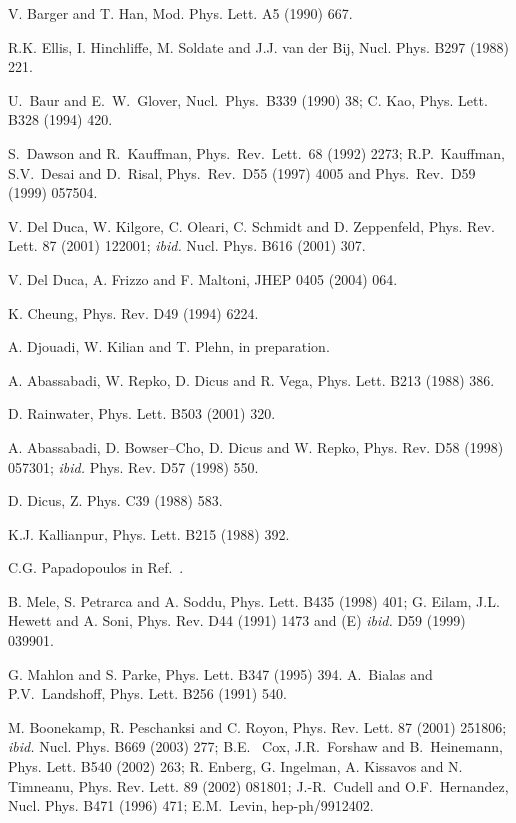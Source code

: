 \begin{thebibliography}{999}
V. Barger and T. Han, Mod. Phys. Lett. A5 (1990) 667.  

 R.K. Ellis, I. Hinchliffe, M. Soldate and J.J. van der 
Bij, Nucl. Phys. B297 (1988) 221.  

 U.~Baur and E.~W.~Glover, Nucl.\ Phys.\ B339 (1990) 38;
C. Kao, Phys. Lett. B328 (1994) 420. 

S.~Dawson and R.~Kauffman, Phys.\ Rev.\ Lett.\ 68 (1992) 2273;
R.P.~Kauffman, S.V.~Desai and D.~Risal, Phys.\ Rev.\ D55 (1997) 4005 and
Phys.\ Rev.\ D59 (1999) 057504. 

 V. Del Duca, W. Kilgore, C. Oleari, C. Schmidt and D.
Zeppenfeld, Phys. Rev. Lett. 87 (2001) 122001; {\it ibid.} Nucl. Phys. B616 
(2001) 307. 

  V. Del Duca, A. Frizzo and F. Maltoni, JHEP 0405 (2004) 
064.  

 K. Cheung, Phys. Rev. D49 (1994) 6224.  

 A. Djouadi, W. Kilian and T. Plehn, in preparation.

 A. Abassabadi, W. Repko, D. Dicus and R. Vega, Phys. Lett. 
B213 (1988) 386.  

 D. Rainwater, Phys. Lett. B503 (2001) 320.

 A. Abassabadi, D. Bowser--Cho, D. Dicus and W. Repko, 
Phys. Rev. D58 (1998) 057301; {\it ibid.} Phys. Rev. D57 (1998) 550. 

 D. Dicus, Z. Phys. C39 (1988) 583. 

 K.J.  Kallianpur, Phys. Lett. B215 (1988) 392. 

 C.G. Papadopoulos in Ref.~\cite{SLHC}. 
  
B. Mele, S. Petrarca and A. Soddu, Phys. Lett. B435 (1998) 401; 
G. Eilam, J.L. Hewett and  A. Soni, Phys. Rev. D44 (1991) 1473 and (E) {\it 
ibid.} D59 (1999) 039901.

 G. Mahlon and S. Parke, Phys. Lett. B347 (1995) 394. 
 A.~Bialas and P.V.~Landshoff, Phys. Lett. B256 (1991) 540.

 M. Boonekamp, R. Peschanksi and C. Royon, Phys. Rev. Lett.
87 (2001) 251806; {\it ibid.} Nucl. Phys. B669 (2003) 277; B.E. ~Cox, 
J.R.~Forshaw and B.~Heinemann, Phys. Lett. B540 (2002) 263; R. Enberg, 
G. Ingelman, A. Kissavos and N. Timneanu, Phys. Rev. Lett. 89 (2002) 081801; 
J.-R.~Cudell and O.F.~Hernandez, Nucl. Phys. B471 
(1996) 471; E.M.~Levin, hep-ph/9912402. 
 

\end{thebibliography}
